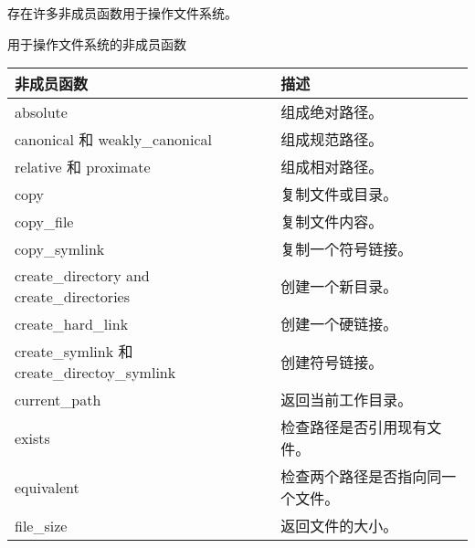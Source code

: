存在许多非成员函数用于操作文件系统。

\begin{center}
用于操作文件系统的非成员函数
\end{center}

\begin{longtable}[c]{|l|l|}
\hline
\textbf{非成员函数}                 & \textbf{描述}                                            \\ \hline
\endfirsthead
%
\endhead
%
absolute                                      & 组成绝对路径。                                      \\ \hline
canonical 和 weakly\_canonical               & 组成规范路径。                                      \\ \hline
relative 和 proximate                        & 组成相对路径。                                       \\ \hline
copy                                          & 复制文件或目录。                                    \\ \hline
copy\_file                                    & 复制文件内容。                                           \\ \hline
copy\_symlink                                 & 复制一个符号链接。                                         \\ \hline
create\_directory and create\_directories     & 创建一个新目录。                                        \\ \hline
create\_hard\_link                            & 创建一个硬链接。                                            \\ \hline
create\_symlink 和 create\_directoy\_symlink & 创建符号链接。                                        \\ \hline
current\_path                                 & 返回当前工作目录。                          \\ \hline
exists                                        & 检查路径是否引用现有文件。                  \\ \hline
equivalent                                    & 检查两个路径是否指向同一个文件。                     \\ \hline
file\_size                                    & 返回文件的大小。                                       \\ \hline

\end{longtable}
